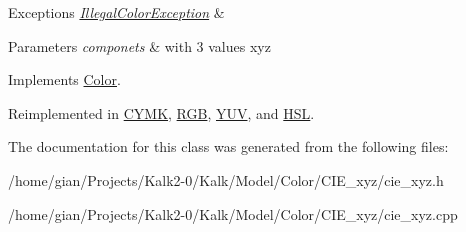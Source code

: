 \begin{DoxyExceptions}{Exceptions}
{\em \hyperlink{class_illegal_color_exception}{Illegal\+Color\+Exception}} & \\
\hline
\end{DoxyExceptions}

\begin{DoxyParams}{Parameters}
{\em componets} & with 3 values xyz \\
\hline
\end{DoxyParams}


Implements \hyperlink{class_color}{Color}.



Reimplemented in \hyperlink{class_c_y_m_k_a897a2a1030cfd10dc16d5e2de825b45e}{C\+Y\+MK}, \hyperlink{class_r_g_b_acf213178f2029a5f304d62b87dbb6b36}{R\+GB}, \hyperlink{class_y_u_v_a622daf7a688da4a227b63deb412c0d46}{Y\+UV}, and \hyperlink{class_h_s_l_a101be14729707abca388680610e2fe86}{H\+SL}.



The documentation for this class was generated from the following files\+:\begin{DoxyCompactItemize}
\item 
/home/gian/\+Projects/\+Kalk2-\/0/\+Kalk/\+Model/\+Color/\+C\+I\+E\+\_\+xyz/cie\+\_\+xyz.\+h\item 
/home/gian/\+Projects/\+Kalk2-\/0/\+Kalk/\+Model/\+Color/\+C\+I\+E\+\_\+xyz/cie\+\_\+xyz.\+cpp\end{DoxyCompactItemize}
